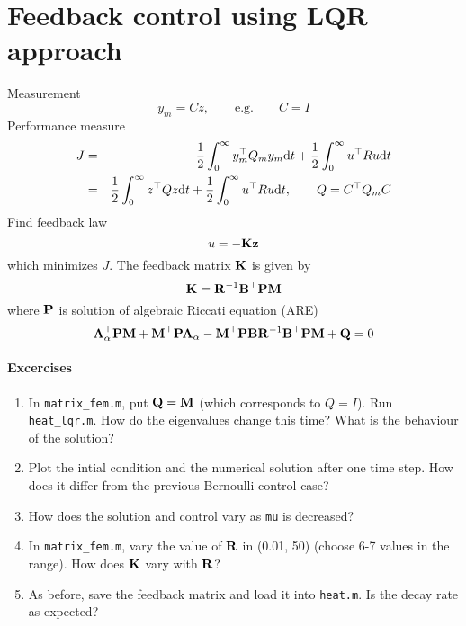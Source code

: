 \documentclass[12pt]{article}
\begin{document}

\section{Feedback control using LQR approach}
Measurement
\[
y_m = C z, \qquad \textrm{e.g.} \qquad C = I
\]
Performance measure
\begin{eqnarray*}
J &=& \frac{1}{2}\int_0^\infty y_m^\top Q_m y_m \textrm{d} t + \frac{1}{2} \int_0^\infty u^\top R 
u \textrm{d} t \\
&=& \frac{1}{2}\int_0^\infty z^\top Q z \textrm{d} t + \frac{1}{2} \int_0^\infty u^\top R u \textrm{d}   
t , \qquad Q = C^\top Q_m C
\end{eqnarray*}
Find feedback law
\[
u = -{\mathbf K} {\mathbf z}
\]
which minimizes $J$. The feedback matrix ${\mathbf K}$ is given by
\[
{\mathbf K} = {\mathbf R}^{-1} {\mathbf B}^\top {\mathbf P} {\mathbf M}
\]
where ${\mathbf P}$ is solution of algebraic Riccati equation (ARE)
\[
{\mathbf A}^\top_\alpha {\mathbf P} {\mathbf M} + {\mathbf M}^\top {\mathbf P} {\mathbf A}_\alpha - {\mathbf M}^\top {\mathbf P} {\mathbf B} {\mathbf R}^{-1} {\mathbf B}^\top {\mathbf P} {\mathbf M} + {\mathbf Q} = 0
\]

\paragraph{Excercises}

\begin{enumerate}

\item In {\tt matrix\_fem.m}, put ${\mathbf Q} = {\mathbf M}$ (which corresponds to $Q = I$). Run {\tt heat\_lqr.m}. How do the eigenvalues change this time? What is the behaviour of the solution?

\item Plot the intial condition and the numerical solution after one time step. How does it differ from the previous Bernoulli control case?

\item How does the solution and control vary as {\tt mu} is decreased?

\item In {\tt matrix\_fem.m}, vary the value of ${\mathbf R}$ in (0.01, 50) (choose 6-7 values in the range). How does ${\mathbf K}$ vary with ${\mathbf R}$?

\item As before, save the feedback matrix and load it into {\tt heat.m}. Is the decay rate as expected?
\end{enumerate}
\end{document}
